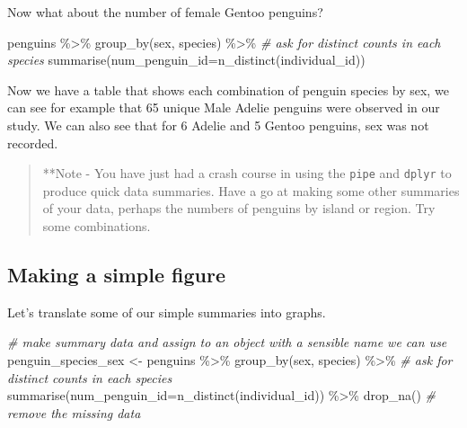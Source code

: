 \documentclass[
]{book}
\newenvironment{Shaded}{\begin{snugshade}}{\end{snugshade}}
\newcommand{\AttributeTok}[1]{\textcolor[rgb]{0.77,0.63,0.00}{#1}}
\newcommand{\CommentTok}[1]{\textcolor[rgb]{0.56,0.35,0.01}{\textit{#1}}}
\newcommand{\FunctionTok}[1]{\textcolor[rgb]{0.00,0.00,0.00}{#1}}
\newcommand{\NormalTok}[1]{#1}
\newcommand{\OtherTok}[1]{\textcolor[rgb]{0.56,0.35,0.01}{#1}}
\newcommand{\SpecialCharTok}[1]{\textcolor[rgb]{0.00,0.00,0.00}{#1}}
\begin{document}
Now what about the number of female Gentoo penguins?

\begin{Shaded}
\begin{Highlighting}[]
\NormalTok{penguins }\SpecialCharTok{\%\textgreater{}\%} 
  \FunctionTok{group\_by}\NormalTok{(sex, species) }\SpecialCharTok{\%\textgreater{}\%} \CommentTok{\# ask for distinct counts in each species}
  \FunctionTok{summarise}\NormalTok{(}\AttributeTok{num\_penguin\_id=}\FunctionTok{n\_distinct}\NormalTok{(individual\_id))}
\end{Highlighting}
\end{Shaded}

Now we have a table that shows each combination of penguin species by sex, we can see for example that 65 unique Male Adelie penguins were observed in our study. We can also see that for 6 Adelie and 5 Gentoo penguins, sex was not recorded.

\begin{quote}
**Note - You have just had a crash course in using the \texttt{pipe} and \texttt{dplyr} to produce quick data summaries. Have a go at making some other summaries of your data, perhaps the numbers of penguins by island or region. Try some combinations.
\end{quote}

\hypertarget{making-a-simple-figure}{%
\subsection{Making a simple figure}\label{making-a-simple-figure}}

Let's translate some of our simple summaries into graphs.

\begin{Shaded}
\begin{Highlighting}[]
\CommentTok{\# make summary data and assign to an object with a sensible name we can use}
\NormalTok{penguin\_species\_sex }\OtherTok{\textless{}{-}}\NormalTok{ penguins }\SpecialCharTok{\%\textgreater{}\%} 
  \FunctionTok{group\_by}\NormalTok{(sex, species) }\SpecialCharTok{\%\textgreater{}\%} \CommentTok{\# ask for distinct counts in each species}
  \FunctionTok{summarise}\NormalTok{(}\AttributeTok{num\_penguin\_id=}\FunctionTok{n\_distinct}\NormalTok{(individual\_id)) }\SpecialCharTok{\%\textgreater{}\%} 
  \FunctionTok{drop\_na}\NormalTok{() }\CommentTok{\# remove the missing data}
\end{Highlighting}
\end{Shaded}
\end{document}
